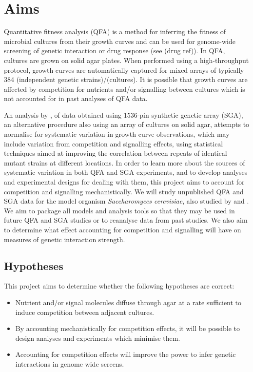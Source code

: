 
\section{Aims}
\label{sec:aims}
Quantitative fitness analysis (QFA) is a method for inferring the
fitness of microbial cultures from their growth curves and can be used
for genome-wide screening of genetic interaction or drug response (see
\citet{Addinall2008,Addinall2011,Lawless2010,Banks2012} (drug
ref)). In QFA, cultures are grown on solid agar plates. When performed
using a high-throughput protocol, growth curves are automatically
captured for mixed arrays of typically 384 (independent genetic
strains)/(cultures). It is possible that growth curves are affected by
competition for nutrients and/or signalling between cultures which is
not accounted for in past analyses of QFA data.

An analysis by \citet{Baryshnikova2010}, of data obtained using
1536-pin synthetic genetic array (SGA), an alternative procedure also
using an array of cultures on solid agar, attempts to normalise for
systematic variation in growth curve observations, which may include
variation from competition and signalling effects, using statistical
techniques aimed at improving the correlation between repeats of
identical mutant strains at different locations. In order to learn
more about the sources of systematic variation in both QFA and SGA
experiments, and to develop analyses and experimental designs for
dealing with them, this project aims to account for competition and
signalling mechanistically. We will study unpublished QFA and SGA data
for the model organism \textit{Saccharomyces cerevisiae}, also studied
by \citet{Addinall2008,Addinall2011} and \citet{Baryshnikova2010}.  We
aim to package all models and analysis tools so that they may be used
in future QFA and SGA studies or to reanalyse data from past
studies. We also aim to determine what effect accounting for
competition and signalling will have on measures of genetic
interaction strength.



\subsection{Hypotheses}
This project aims to determine whether
the following hypotheses are correct:
\begin{itemize}
\item Nutrient and/or signal molecules diffuse through agar at a rate
  sufficient to induce competition between adjacent cultures.
\item By accounting mechanistically for competition effects, it will
  be possible to design analyses and experiments which minimise them.
\item Accounting for competition effects will improve the power to
  infer genetic interactions in genome wide screens.
\end{itemize}



